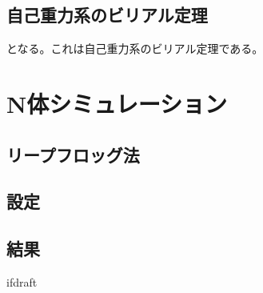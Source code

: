 \documentclass{jsarticle}
\begin{document}
\subsection {自己重力系のビリアル定理}
となる。これは自己重力系のビリアル定理である。

\section {N体シミュレーション}
\subsection {リープフロッグ法}
\subsection {設定}
\subsection {結果}

\expandafter\ifx\csname ifdraft\endcsname\relax
  
\end{document}
